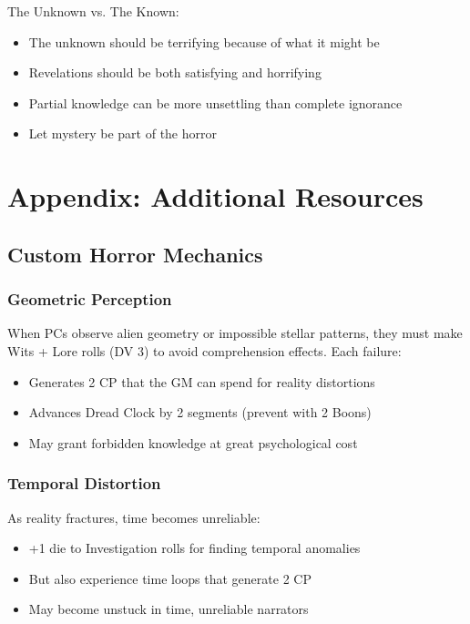 \documentclass[11pt]{article}
\begin{document}
The Unknown vs. The Known:
\begin{itemize}
\item The unknown should be terrifying because of what it might be
\item Revelations should be both satisfying and horrifying
\item Partial knowledge can be more unsettling than complete ignorance
\item Let mystery be part of the horror
\end{itemize}

\section{Appendix: Additional Resources}

\subsection{Custom Horror Mechanics}

\subsubsection{Geometric Perception}

When PCs observe alien geometry or impossible stellar patterns, they must make Wits + Lore rolls (DV 3) to avoid comprehension effects. Each failure:
\begin{itemize}
\item Generates 2 CP that the GM can spend for reality distortions
\item Advances Dread Clock by 2 segments (prevent with 2 Boons)
\item May grant forbidden knowledge at great psychological cost
\end{itemize}

\subsubsection{Temporal Distortion}

As reality fractures, time becomes unreliable:
\begin{itemize}
\item +1 die to Investigation rolls for finding temporal anomalies
\item But also experience time loops that generate 2 CP
\item May become unstuck in time, unreliable narrators
\end{itemize}
\end{document}
